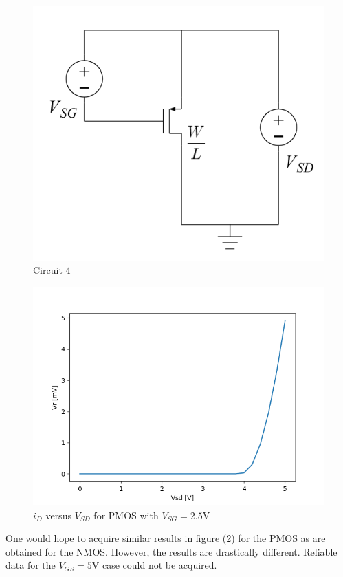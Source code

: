 \FloatBarrier

\begin{figure}[h!]
	\centering
	\includegraphics[scale=0.75]{../images/circuit_4.PNG}
	\caption{Circuit 4}
	\label{fig:circuit_4}
\end{figure}

\FloatBarrier

\FloatBarrier

\begin{figure}[h!]
	\centering
	\includegraphics[scale=0.75]{../images/data_4.PNG}
	\caption{$i_{D}$ versus $V_{SD}$ for PMOS with $V_{SG} = 2.5$\si{\volt}}
	\label{fig:data_4}
\end{figure}

\FloatBarrier

One would hope to acquire similar results in figure (\ref{fig:data_4}) for the PMOS as are obtained for the NMOS.
However, the results are drastically different.
Reliable data for the $V_{GS} = 5$\si{\volt} case could not be acquired.
